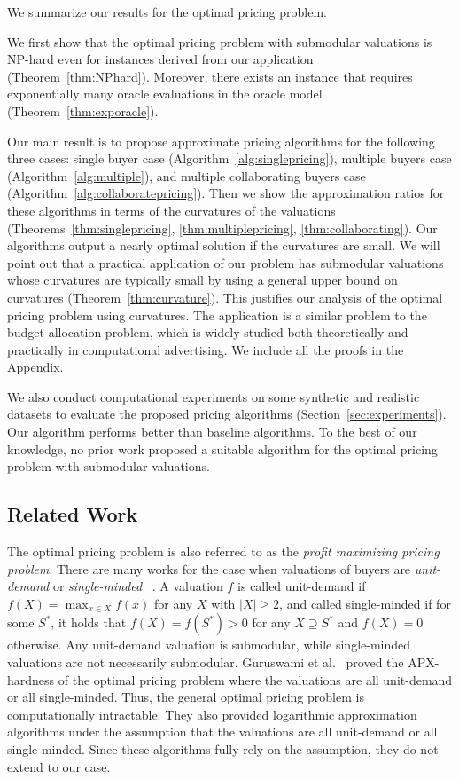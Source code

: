 \documentclass[letterpaper]{article}
\theoremstyle{definition}
\begin{document}
We summarize our results for the optimal pricing problem.

We first show that the optimal pricing problem with submodular valuations is NP-hard even for instances derived from our application (Theorem~\ref{thm:NPhard}).
Moreover, there exists an instance that requires exponentially many oracle evaluations in the oracle model (Theorem~\ref{thm:exporacle}).

Our main result is to propose approximate pricing algorithms for the following three cases: single buyer case (Algorithm~\ref{alg:singlepricing}), multiple buyers case (Algorithm~\ref{alg:multiple}), and multiple collaborating buyers case (Algorithm~\ref{alg:collaboratepricing}).
Then we show the approximation ratios for these algorithms in terms of the curvatures of the valuations (Theorems~\ref{thm:singlepricing}, \ref{thm:multiplepricing}, \ref{thm:collaborating}).
Our algorithms output a nearly optimal solution if the curvatures are small.
We will point out that a practical application of our problem has submodular valuations whose curvatures are typically small by using a general upper bound on curvatures (Theorem~\ref{thm:curvature}).
This justifies our analysis of the optimal pricing problem using curvatures.
The application is a similar problem to the budget allocation problem, which is widely studied both theoretically and practically in computational advertising.
We include all the proofs in the Appendix.


We also conduct computational experiments on some synthetic and realistic datasets to evaluate the proposed pricing algorithms (Section~\ref{sec:experiments}). %
Our algorithm performs better than baseline algorithms.
To the best of our knowledge, no prior work proposed a suitable algorithm for the optimal pricing problem with submodular valuations.


\subsection{Related Work}
\label{sec:relatedwork}

The optimal pricing problem is also referred to as the \emph{profit maximizing pricing problem}.
There are many works for the case when valuations of buyers are \emph{unit-demand} or \emph{single-minded}~
\cite{aggarwal2004algorithms,goldberg2003envy,goldberg2001competitive,guruswami2005profit,cheung2008approximation,anshelevich2015envy}.
A valuation $f$ is called unit-demand if $f(X)=\max_{x \in X} f(x)$ for any $X$ with $|X| \geq 2$, and called single-minded if for some $S^*$, it holds that $f(X)=f(S^*) > 0$ for any $X \supseteq S^*$ and $f(X)=0$ otherwise.
Any unit-demand valuation is submodular, while single-minded valuations are not necessarily submodular.
Guruswami et al.~ proved the APX-hardness of the optimal pricing problem where the valuations are all unit-demand or all single-minded.
Thus, the general optimal pricing problem is computationally intractable.
They also provided logarithmic approximation algorithms under the assumption that the valuations are all unit-demand or all single-minded.
Since these algorithms fully rely on the assumption, they do not extend to our case.
\end{document}
